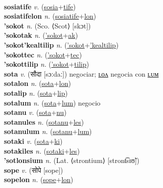  \label{sosiatafulum} \\
\textbf{sosiatife} \textit{v.} (\hyperref[sosia]{sosia}+\hyperref[tife]{tife})
 \label{sosiatife} \\
\textbf{sosiatifelon} \textit{n.} (\hyperref[sosiatife]{sosiatife}+\hyperref[lon]{lon})
 \label{sosiatifelon} \\
\textbf{'sokot} \textit{n.} (Sco. ⟨Scot⟩ [skɔt])
 \label{'sokot} \\
\textbf{'sokotak} \textit{n.} (\hyperref['sokot]{'sokot}+\hyperref[ak]{ak})
 \label{'sokotak} \\
\textbf{'sokot'kealtilip} \textit{n.} (\hyperref['sokot]{'sokot}+\hyperref['kealtilip]{'kealtilip})
 \label{'sokot'kealtilip} \\
\textbf{'sokottec} \textit{n.} (\hyperref['sokot]{'sokot}+\hyperref[tec]{tec})
 \label{'sokottec} \\
\textbf{'sokottilip} \textit{n.} (\hyperref['sokot]{'sokot}+\hyperref[tilip]{tilip})
 \label{'sokottilip} \\
\textbf{sota} \textit{v.} ({\devanagari{}सौदा} [sɔːdaː])
negociar; \hyperref[sotalon]{ʟᴏᴧ} negocia con \hyperref[sotalum]{ʟᴜᴍ} \label{sota} \\
\textbf{sotalon} \textit{n.} (\hyperref[sota]{sota}+\hyperref[lon]{lon})
 \label{sotalon} \\
\textbf{sotalip} \textit{n.} (\hyperref[sota]{sota}+\hyperref[lip]{lip})
 \label{sotalip} \\
\textbf{sotalum} \textit{n.} (\hyperref[sota]{sota}+\hyperref[lum]{lum})
negocio \label{sotalum} \\
\textbf{sotanu} \textit{v.} (\hyperref[sota]{sota}+\hyperref[nu]{nu})
 \label{sotanu} \\
\textbf{sotanules} \textit{n.} (\hyperref[sotanu]{sotanu}+\hyperref[les]{les})
 \label{sotanules} \\
\textbf{sotanulum} \textit{n.} (\hyperref[sotanu]{sotanu}+\hyperref[lum]{lum})
 \label{sotanulum} \\
\textbf{sotaki} \textit{v.} (\hyperref[sota]{sota}+\hyperref[ki]{ki})
 \label{sotaki} \\
\textbf{sotakiles} \textit{n.} (\hyperref[sotaki]{sotaki}+\hyperref[les]{les})
 \label{sotakiles} \\
\textbf{'sotlonsium} \textit{n.} (Lat. ⟨strontium⟩ [stront͡sɪʊ̃])
 \label{'sotlonsium} \\
\textbf{sope} \textit{v.} ({\devanagari{}सोपे} [sope])
 \label{sope} \\
\textbf{sopelon} \textit{n.} (\hyperref[sope]{sope}+\hyperref[lon]{lon})
